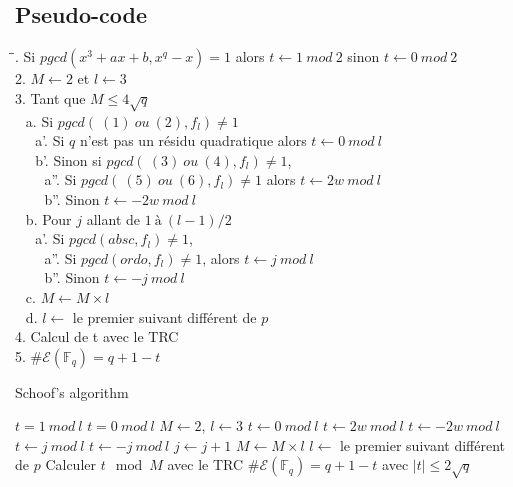 \documentclass[letterpaper, 12pt]{article}
\newcommand{\F}{\mathbb{F}_q}
\newcommand{\E}{\mathcal{E}}
\begin{document}
\subsection{Pseudo-code}

\begin{tabbing}
\hspace{2cm}\=\hspace{2cm}\=. Si $ pgcd(x^3+ax+b,x^q-x) = 1 $ alors $ t \gets 1\ mod\ 2 $ sinon $ t \gets 0\ mod\ 2 $\\
2. $ M \gets 2 $ et $ l \gets 3 $ \\
3. Tant que $ M \leq 4\sqrt{q} $\\
$ \ \ $ a. Si $ pgcd(\ (1)\ ou\ (2), f_l) \neq 1 $\\
$ \ \ \ \ \ $ a'. Si $q$ n'est pas un résidu quadratique alors $ t \gets 0\ mod\ l $\\
$ \ \ \ \ \ $ b'. Sinon si $ pgcd(\ (3)\ ou\ (4), f_l) \neq 1 $,\\
$ \ \ \ \ \ \ \ \ $ a''. Si $ pgcd(\ (5)\ ou\ (6), f_l) \neq 1 $ alors $ t \gets 2w\ mod\ l $\\
$ \ \ \ \ \ \ \ \ $ b''. Sinon $ t \gets -2w\ mod\ l $\\
$ \ \ $ b. Pour $j$ allant de $ 1\ à\ (l-1)/2 $\\
$ \ \ \ \ \ $ a'. Si $ pgcd(absc, f_l) \neq 1 $,\\
$ \ \ \ \ \ \ \ \ $ a''. Si $ pgcd(ordo, f_l) \neq 1 $, alors $ t \gets j\ mod\ l $\\
$ \ \ \ \ \ \ \ \ $ b''. Sinon $ t \gets -j\ mod\ l $\\
$ \ \ $ c. $ M \gets M \times l $\\
$ \ \ $ d. $ l \gets $ le premier suivant différent de $p$\\
4. Calcul de t avec le TRC\\
5. $ \#\E(\F) = q+1-t $\\
\end{tabbing}

\begin{algorithm}
\caption{Schoof's algorithm}
\begin{algorithmic}[1]
    \State $ t = 1\ mod\ l $
\Else{}
    \State $ t = 0\ mod\ l $
\EndIf
\State $ M \gets 2 $, $ l \gets 3 $
\State $ t \gets 0\ mod\ l $
\Else{}
\State $ t \gets 2w\ mod\ l $
\Else{}
\State $ t \gets -2w\ mod\ l $
\EndIf
\EndIf
\EndIf
\EndIf
{}
\State $ t \gets j\ mod\ l $
\Else{}
\State $ t \gets -j\ mod\ l $
\EndIf
\EndIf
\State $j \gets j+1$
\EndFor
\State $ M \gets M \times l $
\State $ l \gets $ le premier suivant différent de $p$
\EndWhile
\State Calculer $t \mod M$ avec le TRC
\State $ \#\E(\F) = q+1-t $ avec $|t|\leq 2\sqrt{q}$
\EndProcedure
\end{algorithmic}
\end{algorithm}
\end{document}
